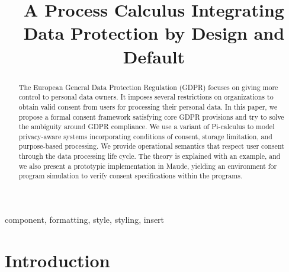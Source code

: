 \documentclass[conference]{IEEEtran}
\begin{document}
\title{ A Process Calculus Integrating Data Protection by Design and Default \\
}

\author{
\and
{}
\and
{}
}

\maketitle

\begin{abstract}
The European General Data Protection Regulation (GDPR) focuses on giving more control to personal data owners. It imposes several restrictions on organizations to obtain valid consent from users for processing their personal data. In this paper, we propose a formal consent framework satisfying core GDPR provisions and try to solve the ambiguity around GDPR compliance. We use a variant of Pi-calculus to model privacy-aware systems incorporating conditions of consent, storage limitation, and purpose-based processing. We provide operational semantics that respect user consent through the data processing life cycle. The theory is explained with an example, and we also present a prototypic implementation in Maude, yielding an environment for program simulation to verify consent specifications within the programs.
\end{abstract}

\begin{IEEEkeywords}
component, formatting, style, styling, insert
\end{IEEEkeywords}

\section{Introduction}
\label{sec:intro}

\vspace{-2mm}
\end{document}
